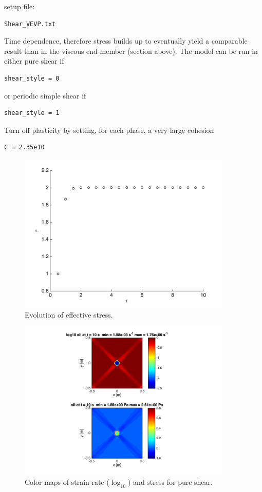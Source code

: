 \documentclass[12pt,english,openany]{scrbook}
\begin{document}
setup file:
\begin{verbatim} 
Shear_VEVP.txt
\end{verbatim}

Time dependence, therefore stress builds up to eventually yield a comparable result than in the viscous end-member (section above).
The model can be run in either pure shear if 
\begin{verbatim} 
shear_style = 0
\end{verbatim}

or periodic simple shear if 
\begin{verbatim} 
shear_style = 1
\end{verbatim}

Turn off plasticity by setting, for each phase, a very large cohesion
\begin{verbatim} 
C = 2.35e10
\end{verbatim}

\begin{figure}[ht!]
\centerline{\includegraphics[height=3.0in]{./Figures/PureShear_pwl_VE_evol}}
\caption{Evolution of effective stress.}
\label{PureShear_pwl_VE_evol}
\end{figure}

\begin{figure}[ht!]
\centerline{\includegraphics[height=3.0in]{./Figures/PureShear_pwl_VE_cmaps}}
\caption{Color maps of strain rate ($\log_{10}$) and stress for pure shear.}
\label{PureShear_pwl_VE_cmaps}
\end{figure}
\end{document}

